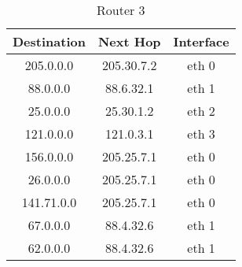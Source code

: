 \documentclass{WeSTassignment}
\begin{document}
\begin{table}[h]
\centering
\caption{Router 3}
\label{Router 3}
\begin{tabular}{ccc}
\hline
\multicolumn{1}{|c|}{\textbf{Destination}} & \multicolumn{1}{c|}{\textbf{Next Hop}} & \multicolumn{1}{c|}{\textbf{Interface}} \\ \hline
205.0.0.0                                  & 205.30.7.2                             & eth 0                                   \\
88.0.0.0                                   & 88.6.32.1                              & eth 1                                   \\
25.0.0.0                                   & 25.30.1.2                              & eth 2                                   \\
121.0.0.0                                  & 121.0.3.1                              & eth 3                                   \\
156.0.0.0                                  & 205.25.7.1                             & eth 0                                   \\
26.0.0.0                                   & 205.25.7.1                             & eth 0                                   \\
141.71.0.0                                  & 205.25.7.1                             & eth 0                                   \\
67.0.0.0                                   & 88.4.32.6                              & eth 1                                   \\
62.0.0.0                                   & 88.4.32.6                              & eth 1                                  
\end{tabular}
\end{table}


\end{document}
